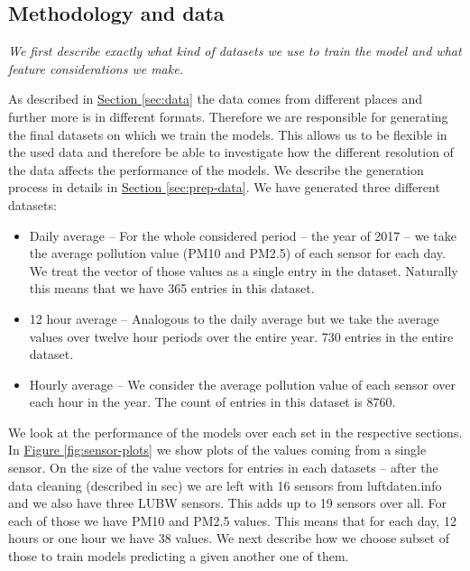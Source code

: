 \documentclass[12pt,a4paper,twoside]{scrartcl}
\numberwithin{equation}{section}
\newcommand{\reffig}[1]{\hyperref[#1]{Figure \ref*{#1}}}
\newcommand{\refsec}[1]{\hyperref[#1]{Section \ref*{#1}}}
\begin{document}
\subsection{Methodology and data}\label{sec:preprop-meth}
\noindent
\emph{We first describe exactly what kind of datasets we use to train the model and what feature considerations we make.}

As described in \refsec{sec:data} the data comes from different places and further more is in different formats. Therefore we are responsible for generating the final datasets on which we train the models. This allows us to be flexible in the used data and therefore be able to investigate how the different resolution of the data affects the performance of the models. We describe the generation process in details in \refsec{sec:prep-data}. We have generated three different datasets:
\begin{itemize}
\item Daily average -- For the whole considered period -- the year of 2017 -- we take the average pollution value (PM10 and PM2.5) of each sensor for each day. We treat the vector of those values as a single entry in the dataset. Naturally this means that we have 365 entries in this dataset.
\item 12 hour average -- Analogous to the daily average but we take the average values over twelve hour periods over the entire year. 730 entries in the entire dataset.
\item Hourly average -- We consider the average pollution value of each sensor over each hour in the year. The count of entries in this dataset is 8760.
\end{itemize}
We look at the performance of the models over each set in the respective sections. In \reffig{fig:sensor-plots} we show plots of the values coming from a single sensor. On the size of the value vectors for entries in each datasets -- after the data cleaning (described in sec) we are left with 16 sensors from luftdaten.info and we also have three LUBW sensors. This adds up to 19 sensors over all. For each of those we have PM10 and PM2.5 values. This means that for each day, 12 hours or one hour we have 38 values. We next describe how we choose subset of those to train models predicting a given another one of them.
\end{document}
